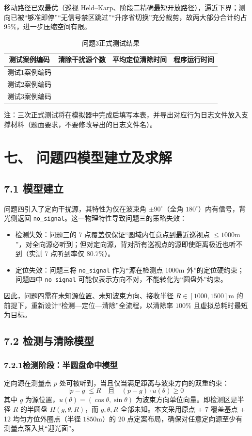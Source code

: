 \documentclass[UTF8, zihao=5,AutoFakeBold=2]{ctexart}
\begin{document}
移动路径已双最优（巡视 Held--Karp、阶段二精确最短开放路径），逼近下界；测向已被“够准即停”“无信号禁区跳过”“升序省切换”充分裁剪，故两大部分合计约占 95\%，进一步压缩空间有限。

\begin{table}[h]
    \centering
    \caption{问题3正式测试结果}
    \begin{tabular}{cccc}
        \toprule
        测试案例编码 & 清除干扰源个数 & 平均定位清除时间 & 程序运行时间 \\
        \midrule
        测试1案例编码 & & & \\
        测试2案例编码 & & & \\
        测试3案例编码 & & & \\
        \bottomrule
    \end{tabular}
    \par\smallskip
    \footnotesize{注：三次正式测试将在模拟器中完成后填写本表，并导出对应行为日志文件放入支撑材料（题面要求，不要修改导出的日志文件名）。}
\end{table}

\section*{七、  问题四模型建立及求解}
	\subsection*{7.1 模型建立}
	问题四引入了定向干扰源，其特性为仅在波束角 $\pm 90^{\circ}$（全角 $180^{\circ}$）内有信号，背光侧返回 \texttt{no\_signal}。这一物理特性导致问题三的策略失效：
\begin{itemize}
    \item 检测失效：问题三的 7 点覆盖仅保证“圆域内任意点到最近巡视点 $\le 1000\text{m}$”，对全向源必听到；但对定向源，背对所有巡视点的源即使距离极近也听不到（实测 7 点听到率仅 $80.7\%$）。
    \item 定位失效：问题三将 \texttt{no\_signal} 作为“源在检测点 1000m 外”的定位硬约束；问题四中 \texttt{no\_signal} 可能仅表示方向不对，不能转化为“圆盘外”约束。
\end{itemize}
因此，问题四需在未知源位置、未知波束方向、接收半径 $R \in [1000, 1500]\text{m}$ 的前提下，重新设计“检测—定位—清除”全流程，以清除率 $100\%$ 且虚拟总耗时最短为目标。

	\subsection*{7.2 检测与清除模型}
	\subsubsection*{7.2.1检测阶段：半圆盘命中模型}
定向源在测量点 $p$ 处可被听到，当且仅当满足距离与波束方向的双重约束：
\begin{equation}
|p - g| \le R \quad \text{且} \quad (p - g) \cdot u(\theta) \ge 0
\end{equation}
其中 $g$ 为源位置，$u(\theta) = (\cos\theta, \sin\theta)$ 为波束方向单位向量。即检测区是半径 $R$ 的半圆盘 $H(g, \theta, R)$，而 $g, \theta, R$ 全部未知。本文采用原点 + 7 覆盖基点 + 12 均匀方位外圈点（半径 $1850\text{m}$）的 20 点定案布局，确保对任意定向源至少有测量点落入其“迎光面”。
\end{document}
